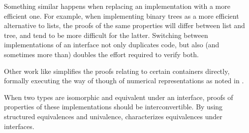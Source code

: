Something similar happens when replacing an implementation with a more efficient one. For example, when implementing binary trees as a more efficient alternative to lists, the proofs of the same properties will differ between list and tree, and tend to be more difficult for the latter. Switching between implementations of an interface not only duplicates code, but also (and sometimes more than) doubles the effort required to verify both.


Other work like \cite{calcdata} simplifies the proofs relating to certain containers directly, formally executing the way of though of numerical representations as noted in \cite{purelyfunctional}.

When two types are isomorphic and equivalent under an interface, proofs of properties of these implementations should be interconvertible. By using structured equivalences and univalence, \cite{iri} characterizes equivalences under interfaces.


